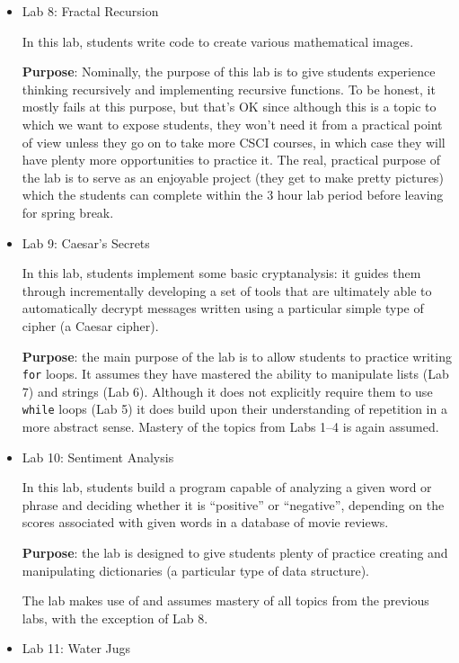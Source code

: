 \documentclass{article}
\begin{document}
\begin{itemize}
\item Lab 8: Fractal Recursion

  In this lab, students write code to create various mathematical
  images.

  \textbf{Purpose}: Nominally, the purpose of this lab is to give
  students experience thinking recursively and implementing recursive
  functions.  To be honest, it mostly fails at this purpose, but
  that's OK since although this is a topic to which we want to expose
  students, they won't need it from a practical point of view unless
  they go on to take more CSCI courses, in which case they will have
  plenty more opportunities to practice it.  The real, practical
  purpose of the lab is to serve as an enjoyable project (they get to
  make pretty pictures) which the students can complete within the 3
  hour lab period before leaving for spring break.

\item Lab 9: Caesar's Secrets

  In this lab, students implement some basic cryptanalysis: it guides
  them through incrementally developing a set of tools that are
  ultimately able to automatically decrypt messages written using a
  particular simple type of cipher (a Caesar cipher).

  \textbf{Purpose}: the main purpose of the lab is to allow students
  to practice writing \texttt{for} loops.  It assumes they have
  mastered the ability to manipulate lists (Lab 7) and strings (Lab
  6).  Although it does not explicitly require them to use
  \texttt{while} loops (Lab 5) it does build upon their
  understanding of repetition in a more abstract sense.  Mastery of
  the topics from Labs 1--4 is again assumed.

\item Lab 10: Sentiment Analysis

  In this lab, students build a program capable of analyzing a given
  word or phrase and deciding whether it is ``positive'' or
  ``negative'', depending on the scores associated with given words in
  a database of movie reviews.

  \textbf{Purpose}: the lab is designed to give students plenty of
  practice creating and manipulating dictionaries (a particular type
  of data structure).

  The lab makes use of and assumes mastery of all topics from the
  previous labs, with the exception of Lab 8.

\item Lab 11: Water Jugs


\end{itemize}
\end{document}
